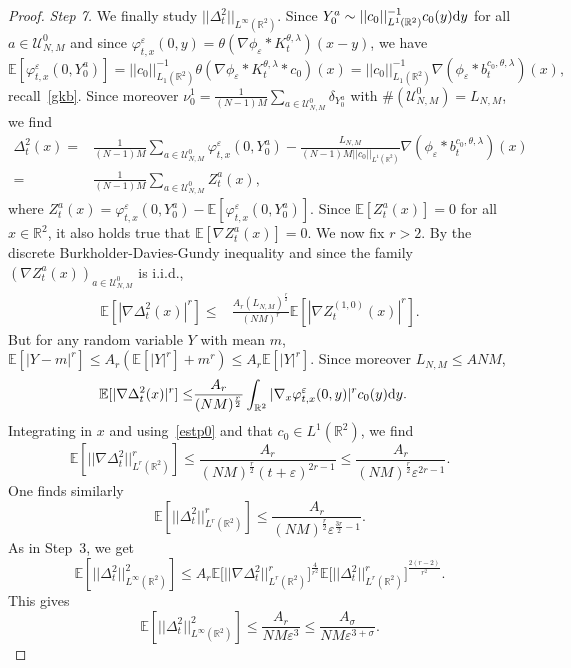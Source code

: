 \documentclass[11pt]{article}
\newcommand{\E}{\mathbb{E}}
\newcommand{\R}{\mathbb{R}}
\newcommand{\1}{\mathbbm{1}}
\newcommand{\dd}{{\rm d}}
\newcommand{\Uu}{\mathcal U}
\newcommand{\e}{\varepsilon}
\begin{document}
\begin{proof}
{\it Step 7.} We finally study $||\Delta_t^2||_{L^\infty(\R^2)}$. Since
$Y^a_0\sim ||c_0||^{-1}_{L^1(\R^2)}c_0(y)\dd y$ for all $a \in \Uu^0_{N,M}$ and
since $\varphi^\e_{t,x}(0,y)= \theta (\nabla \phi_\e \ast K_t^{\theta,\lambda})(x-y)$, we have
$$
\E[\varphi^\e_{t,x}(0,Y^a_0)]=||c_0||_{L_ 1(\R^2)}^{-1}  \theta (\nabla \phi_\e \ast K^{\theta,\lambda}_t\ast c_0)(x)
= ||c_0||_{L_ 1(\R^2)}^{-1} \nabla (\phi_\e\ast b^{c_0,\theta,\lambda}_t)(x), 
$$
recall~\eqref{gkb}.
Since moreover $\nu^1_0=\frac{1}{(N-1)M}\sum_{a\in \Uu_{N,M}^0}\delta_{Y^a_0}$  with $\# (\Uu_{N,M}^0)= L_{N,M}$, we find
\begin{align*}
\Delta^2_t(x)=&\frac1{(N-1)M}\sum_{a \in \Uu_{N,M}^0} \varphi^\e_{t,x}(0,Y^a_0)- \frac{L_{N,M}}{(N-1)M||c_0||_{L^1(\R^2)}} 
\nabla (\phi_\e\ast b^{c_0,\theta,\lambda}_t)(x)\\
=& \frac1{(N-1)M}\sum_{a \in \Uu_{N,M}^0} Z^a_t(x),
\end{align*}
where $Z^a_t(x)=\varphi^\e_{t,x}(0,Y^a_0)-\E[\varphi^\e_{t,x}(0,Y^a_0)]$.
Since $\E[Z^a_t(x)]=0$ for all $x \in \R^2$, it also holds true that $\E[\nabla Z^a_t(x)]=0$. 
We now fix $r>2$.
By the discrete 
Burkholder-Davies-Gundy inequality and since the family $(\nabla Z^a_t(x))_{a \in \Uu_{N,M}^0}$ is i.i.d.,
\begin{align*}
\E[|\nabla \Delta^2_t(x)|^r]\leq & \frac{A_r (L_{N,M})^{\frac r 2}}{(NM)^r} \E[|\nabla Z^{(1,0)}_t(x)|^r].
\end{align*}
But for any random variable $Y$ with mean $m$, $\E[|Y-m|^r]\leq A_r (\E[|Y|^r]+m^r)\leq A_r \E[|Y|^r]$.
Since moreover $L_{N,M}\leq A NM$,
\begin{align*}
\E[|\nabla \Delta^2_t(x)|^r]\leq & \frac{A_{r}}{(NM)^{\frac r2}} \int_{\R^2} |\nabla_x \varphi^\e_{t,x}(0,y)|^rc_0(y)\dd y.
\end{align*}
Integrating in $x$ and using~\eqref{estp0} and that $c_0 \in L^1(\R^2)$, we find
$$
\E[||\nabla \Delta^2_t||_{L^r(\R^2)}^r]\leq  \frac{A_r}{(NM)^{\frac r2} (t+\e)^{2r-1}}\leq  
\frac{A_r}{(NM)^{\frac r2} \e^{2r-1}}.
$$
One finds similarly
$$
\E[||\Delta^2_t||_{L^r(\R^2)}^r]\leq  \frac{A_r}{(NM)^{\frac r2} \e^{\frac{3r}2-1}}.
$$
As in Step~3, we get
$$
\E[||\Delta^2_t||_{L^\infty(\R^2)}^2]\leq A_r \E\Big[||\nabla \Delta^2_t||_{L^r(\R^2)}^r\Big]^{\frac{4}{r^2}}
\E\Big[||\Delta^2_t||_{L^r(\R^2)}^r\Big]^{\frac{2(r-2)}{r^2}}.
$$
This gives
\begin{equation*}
\E[||\Delta^2_t||_{L^\infty(\R^2)}^2]
\leq \frac{A_r}{NM \e^3}\leq \frac{A_\sigma}{NM \e^{3+\sigma}}.
\end{equation*}
\vskip-0.8cm
\end{proof}
\vskip0.6cm
\end{document}
